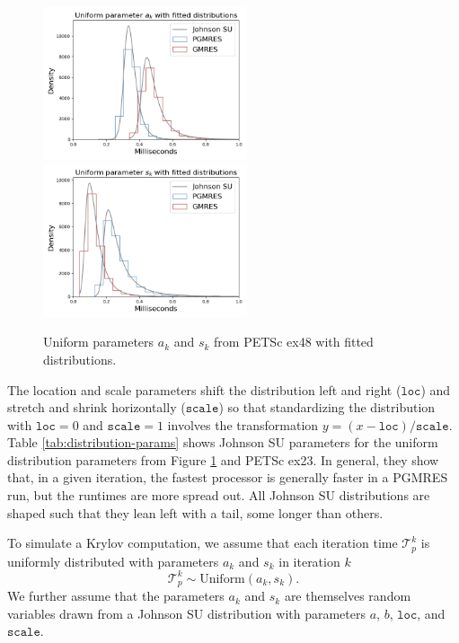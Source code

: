 \documentclass[num-refs]{wiley-article}
\begin{document}
\begin{figure}[t]
\centering
\includegraphics[width=6cm]{../plots/GMRES_PGMRES_ex48_8192_1000000_uniform_a_k_with_johnsonsu.png}
\includegraphics[width=6cm]{../plots/GMRES_PGMRES_ex48_8192_1000000_uniform_s_k_with_johnsonsu.png} 
\caption{Uniform parameters $a_k$ and $s_k$ from PETSc ex48 with fitted distributions.} \label{fig:uniform-params-fitted}
\end{figure}

The location and scale parameters shift the distribution left and right (${\texttt{loc}}$) and stretch and shrink horizontally (${\texttt{scale}}$) so that standardizing the distribution with ${\texttt{loc}} = 0$ and ${\texttt{scale}} = 1$ involves the transformation $y = (x - {\texttt{loc}})/{\texttt{scale}}$.
Table \ref{tab:distribution-params} shows Johnson SU parameters for the  uniform distribution parameters from Figure \ref{fig:uniform-params-fitted} and PETSc ex23. In general, they show that, in a given iteration, the fastest processor is generally faster in a PGMRES run, but the runtimes are more spread out. All Johnson SU distributions are shaped such that they lean left with a tail, some longer than others.

To simulate a Krylov computation, we assume that each iteration time $\mathcal{T}_p^k$ is uniformly distributed with parameters $a_k$ and $s_k$ in iteration $k$
$$\mathcal{T}_p^k \sim \text{Uniform}(a_k, s_k).$$ 
We further assume that the parameters $a_k$ and $s_k$ are themselves random variables drawn from a Johnson SU distribution with parameters $a$, $b$, $\texttt{loc}$, and $\texttt{scale}$.
\end{document}
